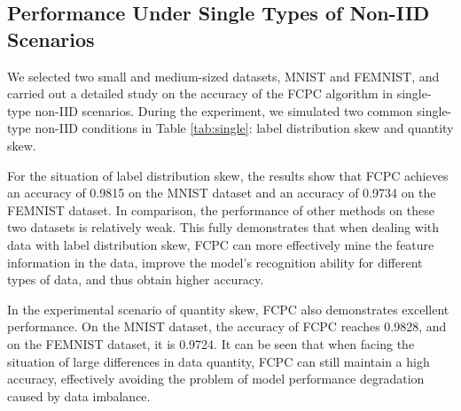 \documentclass[journal,twoside,web]{ieeecolor}
\begin{document}
\subsection{Performance Under Single Types of Non-IID Scenarios}

We selected two small and medium-sized datasets, MNIST\cite{MNIST} and FEMNIST, and carried out a detailed study on the accuracy of the FCPC algorithm in single-type non-IID scenarios.
During the experiment, we simulated two common single-type non-IID conditions in Table \ref{tab:single}: label distribution skew and quantity skew. 

For the situation of label distribution skew, the results show that FCPC achieves an accuracy of 0.9815 on the MNIST dataset and an accuracy of 0.9734 on the FEMNIST dataset. In comparison, the performance of other methods on these two datasets is relatively weak. This fully demonstrates that when dealing with data with label distribution skew, FCPC can more effectively mine the feature information in the data, improve the model's recognition ability for different types of data, and thus obtain higher accuracy.



\begin{table}[h]        %
\caption{Test Accuracy on MNIST and FEMNIST Under Single Types of Non-IID Scenarios}
\label{tab:single}
\centering
\footnotesize
{}
\end{table}

In the experimental scenario of quantity skew, FCPC also demonstrates excellent performance. On the MNIST dataset, the accuracy of FCPC reaches 0.9828, and on the FEMNIST dataset, it is 0.9724. It can be seen that when facing the situation of large differences in data quantity, FCPC can still maintain a high accuracy, effectively avoiding the problem of model performance degradation caused by data imbalance.
\end{document}
